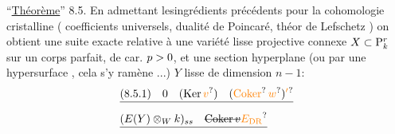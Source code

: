``\uline{Théorème}'' 8.5. En admettant les\handwritten{\,}ingrédients précédents pour la cohomologie cristalline ( coefficients universels, dualité de Poincaré, théor de Lefschetz  ) on obtient une suite exacte\handwritten{,} relative à une variété lisse projective connexe $X\subset\mathrm P^r_k$  sur un corps parfait, de car. $p>0$, et une section hyperplane (ou par une hypersurface , cela s'y ramène ...) $Y$ lisse de dimension $n-1$:
\[
\begin{aligned}
&\deleted{(8.5.1)\quad 0\quad (\mathrm{Ker}\,\unsure{v})\quad(\unsure{\mathrm{Coker}}\,\unsure{w})\unsure{'}}\\
&\deleted{(E(Y)\otimes_W k)_{ss}\quad\deleted{\mathrm{Coker}\,v}\unsure{E_{\rm DR}}}
\end{aligned}
\]


